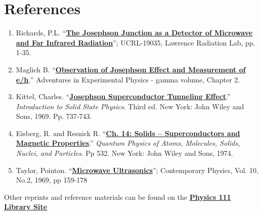 \documentclass{../lab}
\begin{document}
\section{References}
\label{sec:References}

\begin{enumerate}
    \item Richards, P.L. ``\href{http://physics111.lib.berkeley.edu/Physics111/Reprints/JOS/06-The\_Josephson\_Junction\_as\_a\_Detector.pdf}{\textbf{The Josephson Junction as a Detector of Microwave and Far Infrared Radiation}}''; UCRL-19035, Lawrence Radiation Lab, pp. 1-35.

    \item Maglich B. ``\href{http://physics111.lib.berkeley.edu/Physics111/Reprints/JOS/09-Observation\_of\_Josephson\_Effect.pdf}{\textbf{Observation of Josephson Effect and Measurement of e/h}},'' Adventures in Experimental Physics - gamma volume, Chapter 2.

    \item Kittel, Charles. ``\href{http://physics111.lib.berkeley.edu/Physics111/Reprints/JOS/JOS\_Introduction\%20to\%20the\%20solid\%20state\%20physics.pdf}{\textbf{Josephson Superconductor Tunneling Effect}}.'' \emph{Introduction to Solid State Physics}. Third ed. New York: John Wiley and Sons, 1969. Pp. 737-743.

    \item Eisberg, R. and Resnick R. ``\href{http://physics111.lib.berkeley.edu/Physics111/Reprints/JOS/Semiconductors\%20&\%20Magnetic\%20Prop.\%20Ch-14-pg.\%20532.pdf}{\textbf{Ch. 14: Solids -- Superconductors and Magnetic Properties}}.” \emph{Quantum Physics of Atoms, Molecules, Solids, Nuclei, and Particles}. Pp 532. New York: John Wiley and Sons, 1974.

    \item Taylor, Pointon. ``\href{http://physics111.lib.berkeley.edu/Physics111/Reprints/JOS/07-Microwave\_Ultrasonics.pdf}{\textbf{Microwave Ultrasonics}}''; Contemporary Physics, Vol. 10, No.2, 1969, pp 159-178

\end{enumerate}

\noindent Other reprints and reference materials can be found on the \href{http://physics111.lib.berkeley.edu/Physics111/Reprints/JOS/JOS\_index.html}{\textbf{Physics 111 Library Site}}
\end{document}
